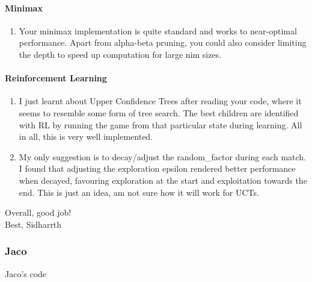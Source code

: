 \paragraph{Minimax}

\begin{enumerate}
    \item Your minimax implementation is quite standard and works to near-optimal performance. Apart from alpha-beta pruning, you could also consider limiting the depth to speed up computation for large nim sizes.
\end{enumerate}

\paragraph{Reinforcement Learning}

\begin{enumerate}
    \item I just learnt about Upper Confidence Trees after reading your code, where it seems to resemble some form of tree search. The best children are identified with RL by running the game from that particular state during learning. All in all, this is very well implemented.
    \item My only suggestion is to decay/adjust the random\_factor during each match. I found that adjusting the exploration epsilon rendered better performance when decayed, favouring exploration at the start and exploitation towards the end. This is just an idea, am not sure how it will work for UCTs.
\end{enumerate}

Overall, good job! \\

Best,
Sidharrth

\subsubsection{Jaco}

Jaco's code

